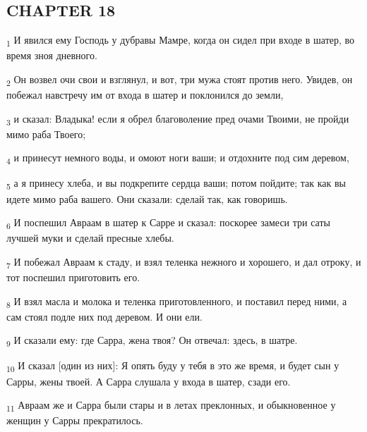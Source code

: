 \subsection{CHAPTER 18}
\begin{tcolorbox}
\textsubscript{1} И явился ему Господь у дубравы Мамре, когда он сидел при входе в шатер, во время зноя дневного.
\end{tcolorbox}
\begin{tcolorbox}
\textsubscript{2} Он возвел очи свои и взглянул, и вот, три мужа стоят против него. Увидев, он побежал навстречу им от входа в шатер и поклонился до земли,
\end{tcolorbox}
\begin{tcolorbox}
\textsubscript{3} и сказал: Владыка! если я обрел благоволение пред очами Твоими, не пройди мимо раба Твоего;
\end{tcolorbox}
\begin{tcolorbox}
\textsubscript{4} и принесут немного воды, и омоют ноги ваши; и отдохните под сим деревом,
\end{tcolorbox}
\begin{tcolorbox}
\textsubscript{5} а я принесу хлеба, и вы подкрепите сердца ваши; потом пойдите; так как вы идете мимо раба вашего. Они сказали: сделай так, как говоришь.
\end{tcolorbox}
\begin{tcolorbox}
\textsubscript{6} И поспешил Авраам в шатер к Сарре и сказал: поскорее замеси три саты лучшей муки и сделай пресные хлебы.
\end{tcolorbox}
\begin{tcolorbox}
\textsubscript{7} И побежал Авраам к стаду, и взял теленка нежного и хорошего, и дал отроку, и тот поспешил приготовить его.
\end{tcolorbox}
\begin{tcolorbox}
\textsubscript{8} И взял масла и молока и теленка приготовленного, и поставил перед ними, а сам стоял подле них под деревом. И они ели.
\end{tcolorbox}
\begin{tcolorbox}
\textsubscript{9} И сказали ему: где Сарра, жена твоя? Он отвечал: здесь, в шатре.
\end{tcolorbox}
\begin{tcolorbox}
\textsubscript{10} И сказал [один из них]: Я опять буду у тебя в это же время, и будет сын у Сарры, жены твоей. А Сарра слушала у входа в шатер, сзади его.
\end{tcolorbox}
\begin{tcolorbox}
\textsubscript{11} Авраам же и Сарра были стары и в летах преклонных, и обыкновенное у женщин у Сарры прекратилось.
\end{tcolorbox}

